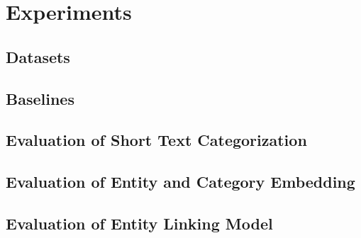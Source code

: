 \section{Experiments} \label{search_entity:evaluation}
\subsection{Datasets} 
\subsection{Baselines}
\subsection{Evaluation of Short Text Categorization}
\subsection{Evaluation of Entity and Category Embedding}
\subsection{Evaluation of Entity Linking Model}

